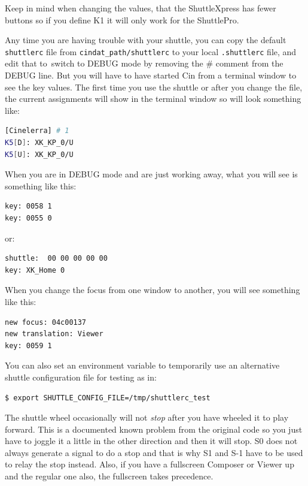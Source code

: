 \noindent Keep in mind when changing the values, that the ShuttleXpress has fewer buttons so if you define K1 it will only work for the ShuttlePro. 

Any time you are having trouble with your shuttle, you can copy the default \texttt{shuttlerc} file from \texttt{{cindat\_path}/shuttlerc} to your local \texttt{.shuttlerc} file, and edit that to\ switch to DEBUG mode by removing the \# comment from the DEBUG line.  But you will have to have started Cin from a terminal window to see the key values. The first time you use the shuttle or after you change the file, the current assignments will show in the terminal window so will look something like:

\begin{lstlisting}[language=Bash,numbers=none]
[Cinelerra] # 1 
K5[D]: XK_KP_0/U 
K5[U]: XK_KP_0/U 
\end{lstlisting}

\noindent When you are in DEBUG mode and are just working away, what you will see is something like this:

\begin{lstlisting}[language=Bash,numbers=none]
key: 0058 1 
key: 0055 0
\end{lstlisting}

or:

\begin{lstlisting}[language=Bash,numbers=none]
shuttle:  00 00 00 00 00 
key: XK_Home 0
\end{lstlisting}

\noindent When you change the focus from one window to another, you will see something like this:

\begin{lstlisting}[language=Bash,numbers=none]
new focus: 04c00137 
new translation: Viewer 
key: 0059 1
\end{lstlisting}

\noindent You can also set an environment variable to temporarily use an alternative shuttle configuration file for testing as in:

\begin{lstlisting}[language=Bash,numbers=none]
$ export SHUTTLE_CONFIG_FILE=/tmp/shuttlerc_test 
\end{lstlisting}

\noindent The shuttle wheel occasionally will not \textit{stop} after you have wheeled it to play forward.  This is a documented known problem from the original code so you just have to joggle it a little in the other direction and then it will stop.  S0 does not always generate a signal to do a stop and that is why S1 and S-1 have to be used to relay the stop instead.  Also, if you have a fullscreen Composer or Viewer up and the regular one also, the fullscreen takes precedence.

